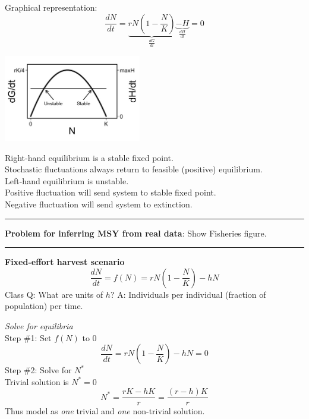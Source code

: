 \documentclass{article}
\newcommand{\note}[1]{\colorbox{gray!30}{#1}}
\newcommand{\ind}{\-\hspace{1cm}}
\begin{document}
Graphical representation:
\begin{equation*}
\frac{dN}{dt}=\underbrace{rN\left(1-\frac{N}{K}\right)}_{\frac{dG}{dt}}\underbrace{-H}_{\frac{dH}{dt}}=0
\end{equation*}
\begin{center}
\includegraphics[width=6cm]{figs/dNdt_harvestquota.jpeg}
\end{center}

Right-hand equilibrium is a stable fixed point.\\
\ind Stochastic fluctuations always return to feasible (positive) equilibrium.\\
Left-hand equilibrium is unstable.\\
\ind Positive fluctuation will send system to stable fixed point.\\
\ind Negative fluctuation will send system to extinction.\\

\rule[0.5ex]{\linewidth}{1pt}

\textbf{Problem for inferring MSY from real data}: \note{Show Fisheries figure.}

\rule[0.5ex]{\linewidth}{1pt}

\textbf{Fixed-effort harvest scenario}
\begin{equation*}
	\frac{dN}{dt}=f(N)=rN\left(1-\frac{N}{K}\right)-hN
\end{equation*}
\note{Class Q:} What are units of $h$? \note{A:} Individuals per individual (fraction of population) per time.
\vspace{0.5cm}

\emph{Solve for equilibria}\\
Step \#1: Set $f(N)$ to $0$
\begin{equation*}
	\frac{dN}{dt}=rN\left(1-\frac{N}{K}\right)-hN=0
\end{equation*}
Step \#2: Solve for $N^*$\\
\ind Trivial solution is $N^*=0$
\begin{equation*}
	N^*=\frac{rK-hK}{r}=\frac{(r-h)K}{r}
\end{equation*}
Thus model as \emph{one} trivial and \emph{one} non-trivial solution.\\
\end{document}
